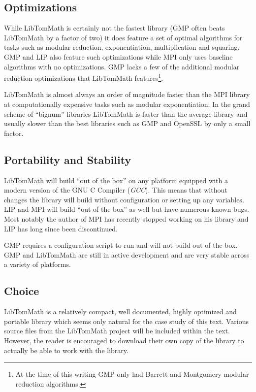 \documentclass[b5paper]{book}
\begin{document}
\subsection{Optimizations}
While LibTomMath is certainly not the fastest library (GMP often beats LibTomMath by a factor of two) it does
feature a set of optimal algorithms for tasks such as modular reduction, exponentiation, multiplication and squaring.  GMP 
and LIP also feature such optimizations while MPI only uses baseline algorithms with no optimizations.  GMP lacks a few
of the additional modular reduction optimizations that LibTomMath features\footnote{At the time of this writing GMP
only had Barrett and Montgomery modular reduction algorithms.}.  

LibTomMath is almost always an order of magnitude faster than the MPI library at computationally expensive tasks such as modular
exponentiation.  In the grand scheme of ``bignum'' libraries LibTomMath is faster than the average library and usually  
slower than the best libraries such as GMP and OpenSSL by only a small factor.

\subsection{Portability and Stability}
LibTomMath will build ``out of the box'' on any platform equipped with a modern version of the GNU C Compiler 
(\textit{GCC}).  This means that without changes the library will build without configuration or setting up any 
variables.  LIP and MPI will build ``out of the box'' as well but have numerous known bugs.  Most notably the author of 
MPI has recently stopped working on his library and LIP has long since been discontinued.  

GMP requires a configuration script to run and will not build out of the box.   GMP and LibTomMath are still in active
development and are very stable across a variety of platforms.

\subsection{Choice}
LibTomMath is a relatively compact, well documented, highly optimized and portable library which seems only natural for
the case study of this text.  Various source files from the LibTomMath project will be included within the text.  However, 
the reader is encouraged to download their own copy of the library to actually be able to work with the library.  
\end{document}
